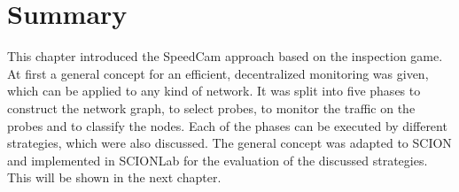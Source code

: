 \documentclass[thesis.tex]{subfiles}
\begin{document}
\section{Summary}
This chapter introduced the SpeedCam approach based on the inspection game. At first a general concept for an efficient, decentralized monitoring was given, which can be applied to any kind of network. It was split into five phases to construct the network graph, to select probes, to monitor the traffic on the probes and to classify the nodes. Each of the phases can be executed by different strategies, which were also discussed. The general concept was adapted to SCION and implemented in SCIONLab for the evaluation of the discussed strategies. This will be shown in the next chapter.
\subfilebib %
\end{document}
